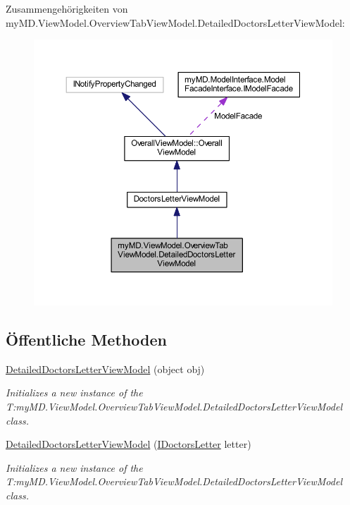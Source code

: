 Zusammengehörigkeiten von my\+M\+D.\+View\+Model.\+Overview\+Tab\+View\+Model.\+Detailed\+Doctors\+Letter\+View\+Model\+:
\nopagebreak
\begin{figure}[H]
\begin{center}
\leavevmode
\includegraphics[width=350pt]{classmy_m_d_1_1_view_model_1_1_overview_tab_view_model_1_1_detailed_doctors_letter_view_model__coll__graph}
\end{center}
\end{figure}
\subsection*{Öffentliche Methoden}
\begin{DoxyCompactItemize}
\item 
\mbox{\hyperlink{classmy_m_d_1_1_view_model_1_1_overview_tab_view_model_1_1_detailed_doctors_letter_view_model_a344adddfaaa08415feb4e37a8d2428f5}{Detailed\+Doctors\+Letter\+View\+Model}} (object obj)
\begin{DoxyCompactList}\small\item\em Initializes a new instance of the T\+:my\+M\+D.\+View\+Model.\+Overview\+Tab\+View\+Model.\+Detailed\+Doctors\+Letter\+View\+Model class. \end{DoxyCompactList}\item 
\mbox{\hyperlink{classmy_m_d_1_1_view_model_1_1_overview_tab_view_model_1_1_detailed_doctors_letter_view_model_aa879528b83398ced704ca2be3b63bb3d}{Detailed\+Doctors\+Letter\+View\+Model}} (\mbox{\hyperlink{interfacemy_m_d_1_1_model_interface_1_1_data_model_interface_1_1_i_doctors_letter}{I\+Doctors\+Letter}} letter)
\begin{DoxyCompactList}\small\item\em Initializes a new instance of the T\+:my\+M\+D.\+View\+Model.\+Overview\+Tab\+View\+Model.\+Detailed\+Doctors\+Letter\+View\+Model class. \end{DoxyCompactList}\end{DoxyCompactItemize}
